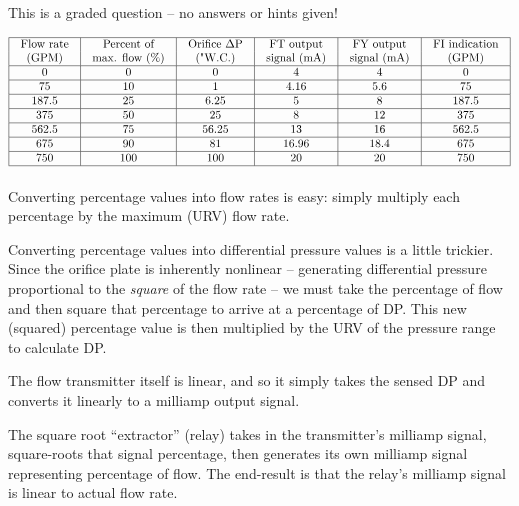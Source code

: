 \vfil

\eject






This is a graded question -- no answers or hints given!








$$\vbox{\offinterlineskip
\halign{\strut
\vrule \quad\hfil # \ \hfil & 
\vrule \quad\hfil # \ \hfil & 
\vrule \quad\hfil # \ \hfil & 
\vrule \quad\hfil # \ \hfil & 
\vrule \quad\hfil # \ \hfil & 
\vrule \quad\hfil # \ \hfil \vrule \cr
\noalign{\hrule}
%
Flow rate & Percent of & Orifice $\Delta$P & FT output & FY output & FI indication \cr
%
(GPM) & max. flow (\%) & ("W.C.) & signal (mA) & signal (mA) & (GPM) \cr
%
\noalign{\hrule}
%
0 & 0 & 0 & 4 & 4 & 0 \cr
%
\noalign{\hrule}
%
75  & 10 & 1 & 4.16 & 5.6 & 75 \cr
%
\noalign{\hrule}
%
187.5  & 25 & 6.25 & 5 & 8 & 187.5 \cr
%
\noalign{\hrule}
%
375 & 50 & 25 & 8 & 12 & 375 \cr
%
\noalign{\hrule}
%
562.5 & 75 & 56.25 & 13 & 16 & 562.5 \cr
%
\noalign{\hrule}
%
675 & 90 & 81 & 16.96 & 18.4 & 675 \cr
%
\noalign{\hrule}
%
750 & 100 & 100 & 20 & 20 & 750 \cr
%
\noalign{\hrule}
} %
}$$ %

Converting percentage values into flow rates is easy: simply multiply each percentage by the maximum (URV) flow rate.

\vskip 10pt

Converting percentage values into differential pressure values is a little trickier.  Since the orifice plate is inherently nonlinear -- generating differential pressure proportional to the {\it square} of the flow rate -- we must take the percentage of flow and then square that percentage to arrive at a percentage of DP.  This new (squared) percentage value is then multiplied by the URV of the pressure range to calculate DP.

\vskip 10pt

The flow transmitter itself is linear, and so it simply takes the sensed DP and converts it linearly to a milliamp output signal.

\vskip 10pt

The square root ``extractor'' (relay) takes in the transmitter's milliamp signal, square-roots that signal percentage, then generates its own milliamp signal representing percentage of flow.  The end-result is that the relay's milliamp signal is linear to actual flow rate.




